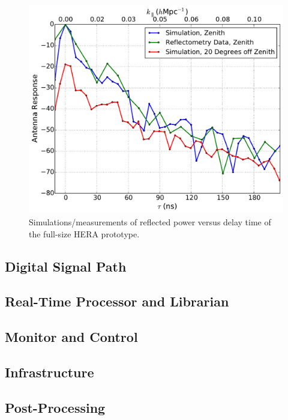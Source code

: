 \documentclass{article}
\begin{document}
\begin{figure}[t]
\centerline{
\includegraphics[width=\textwidth]{plots/compareSimToDataNormalized.pdf} 
}
\caption{\small Simulations/measurements of reflected power versus delay time of the full-size HERA prototype.
\label{fig:refl}}
\end{figure}

\subsection{Digital Signal Path}
\label{sec:DSP}

\subsection{Real-Time Processor and Librarian}
\label{sec:rtplib}

\subsection{Monitor and Control}
\label{sec:moncon}

\subsection{Infrastructure}
\label{sec:infra}

\subsection{Post-Processing}
\label{sec:postproc}
\end{document}
